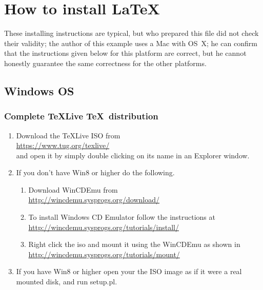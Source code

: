
\chapter{How to install \LaTeX} 
\label{Appendix1}

These installing instructions are typical, but who prepared this file did not check their validity; the author of this example uses a Mac with OS~X; he can confirm that the instructions given below for this platform are correct, but he cannot honestly guarantee the same correctness for the other platforms.



\section*{Windows OS}
\subsection*{Complete TeXLive \TeX~distribution}
\begin{enumerate}
\item	Download the TeXLive ISO from\\
\href{https://www.tug.org/texlive/}{https://www.tug.org/texlive/}\\
and open it by simply double clicking on its name in an Explorer  window.
\item If you don't have Win8 or higher do the following.
\begin{enumerate}
\item	Download WinCDEmu  from \\
\href{http://wincdemu.sysprogs.org/download/}
{http://wincdemu.sysprogs.org/download/}
\item	To install Windows CD Emulator follow the instructions at\\
\href{http://wincdemu.sysprogs.org/tutorials/install/}
{http://wincdemu.sysprogs.org/tutorials/install/}
\item	Right click the iso and mount it using the WinCDEmu as shown in \\
\href{http://wincdemu.sysprogs.org/tutorials/mount/}{
http://wincdemu.sysprogs.org/tutorials/mount/}
\end{enumerate}
\item If you have Win8 or higher open your the ISO image as if it were a real mounted disk, and run setup.pl.
\end{enumerate}

